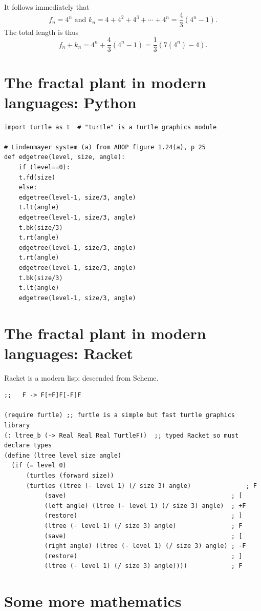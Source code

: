 \documentclass[bigger]{beamer}
\begin{document}
It follows immediately that
\[
f_n=4^n\mbox{ and }k_n=4+4^2+4^3+\cdots+4^n=\frac{4}{3}(4^n-1).
\]
The total length is thus
\[
f_n+k_n=4^n+\frac{4}{3}(4^n-1)=\frac{1}{3}(7(4^n)-4).
\]


\section*{The fractal plant in modern languages: Python}
\label{sec:orgcd8cc98}

\begin{verbatim}
import turtle as t  # "turtle" is a turtle graphics module

# Lindenmayer system (a) from ABOP figure 1.24(a), p 25
def edgetree(level, size, angle):
    if (level==0):
	t.fd(size)
    else:
	edgetree(level-1, size/3, angle)
	t.lt(angle)
	edgetree(level-1, size/3, angle)
	t.bk(size/3)
	t.rt(angle)
	edgetree(level-1, size/3, angle)
	t.rt(angle)
	edgetree(level-1, size/3, angle)
	t.bk(size/3)
	t.lt(angle)
	edgetree(level-1, size/3, angle)
\end{verbatim}

\section*{The fractal plant in modern languages: Racket}
\label{sec:orgdd489e9}

Racket is a modern lisp; descended from Scheme.
\begin{verbatim}
;;   F -> F[+F]F[-F]F

(require furtle) ;; furtle is a simple but fast turtle graphics library
(: ltree_b (-> Real Real Real TurtleF))  ;; typed Racket so must declare types
(define (ltree level size angle)
  (if (= level 0)
      (turtles (forward size))
      (turtles (ltree (- level 1) (/ size 3) angle)               ; F
	       (save)                                             ; [
	       (left angle) (ltree (- level 1) (/ size 3) angle)  ; +F
	       (restore)                                          ; ]
	       (ltree (- level 1) (/ size 3) angle)               ; F 
	       (save)                                             ; [
	       (right angle) (ltree (- level 1) (/ size 3) angle) ; -F
	       (restore)                                          ; ]
	       (ltree (- level 1) (/ size 3) angle))))            ; F
\end{verbatim}

\section*{Some more mathematics}
\label{sec:orgf84faee}
\end{document}
